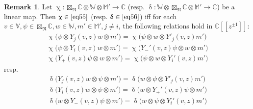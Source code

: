 \documentclass[11pt,b5paper,notitlepage]{article}
\theoremstyle{definition}
\newtheorem{rem}[df]{Remark}
\theoremstyle{plain}
\newcommand{\Vbb}{\mathbb V}
\newcommand{\Wbb}{\mathbb W}
\newcommand{\Mbb}{\mathbb M}
\newcommand{\Cbb}{\mathbb C}
\newcommand{\<}{\left\langle}
\renewcommand{\>}{\right\rangle}
\newcommand{\fn}{\mathfrak{N}}
\numberwithin{equation}{section}
\begin{document}
\begin{rem}\label{lb17}
Let $\upchi:\boxtimes_\fn\Cbb\otimes \Wbb\otimes \Mbb'\rightarrow \Cbb$ (resp. $\updelta:\Wbb\otimes \boxtimes_\fn\Cbb\otimes \Mbb'\rightarrow \Cbb$) be a linear map. Then $\upchi\in \eqref{eq55}$ (resp. $\updelta\in \eqref{eq56}$) iff for each $v\in \Vbb, \psi\in \boxtimes_\fn\Cbb,w\in \Wbb,m'\in \Mbb',j\ne i$, the following relations hold in $\Cbb[[z^{\pm1}]]$:
\begin{subequations}\label{eq116}
\begin{gather}
	\upchi\big(\psi\otimes Y_j(v,z)w\otimes m'\big)=\upchi\big(\psi\otimes w\otimes Y'_j(v,z)m'\big)\\
	\upchi\big(\psi\otimes Y_i(v,z)w\otimes m'\big)=\upchi\big(Y_-'(v,z)\psi\otimes w\otimes m'\big)\\
	\upchi\big(Y_+(v,z)\psi\otimes w\otimes m'\big)=\upchi\big(\psi\otimes w\otimes Y_i'(v,z)m'\big)
\end{gather}
\end{subequations}
resp.
\begin{subequations}\label{eq117}
\begin{gather}
	\updelta\big(Y_j(v,z)w\otimes\psi\otimes m'\big)=\updelta\big(w\otimes\psi\otimes Y'_j(v,z)m'\big)\\
	\updelta\big(Y_i(v,z)w\otimes\psi\otimes m'\big)=\updelta\big(w\otimes Y_+'(v,z)\psi\otimes m'\big)\\
	\updelta\big(w\otimes Y_-(v,z)\psi\otimes m'\big)=\updelta\big(w\otimes\psi\otimes Y_i'(v,z)m'\big)
\end{gather}
\end{subequations}
\end{rem}
\end{document}
